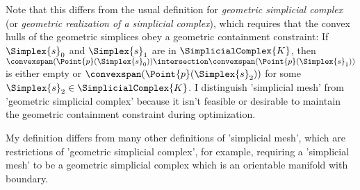 Note that this differs from the usual definition for
{\it geometric simplicial complex}
(or {\it geometric realization of a simplicial complex}),
which requires that the convex hulls of the geometric
simplices obey a geometric containment constraint:
If $\Simplex{s}_0$ and $\Simplex{s}_1$ are in $\SimplicialComplex{K}$,
then $\convexspan ( \Point{p}( \Simplex{s}_0 ) ) \intersection
\convexspan ( \Point{p}( \Simplex{s}_1 ) )$
is either empty or
$\convexspan ( \Point{p}( \Simplex{s}_2 ) )$ 
for some $\Simplex{s}_2 \in \SimplicialComplex{K}$.
I distinguish 'simplicial mesh' from 'geometric simplicial complex'
because it isn't feasible or desirable to maintain the geometric
containment constraint during optimization.

My definition differs from many other definitions of 'simplicial mesh',
which are restrictions of 'geometric simplicial complex', for example,
requiring a 'simplicial mesh' to be a geometric simplicial complex
which is an orientable manifold with boundary.

